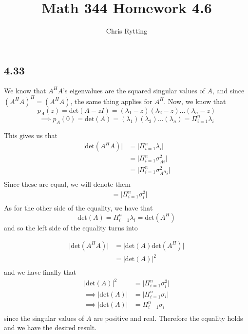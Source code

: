 \documentclass[letterpaper,12pt]{article}
\theoremstyle{definition}
\begin{document}
\title{Math 344 Homework 4.6}
\author{Chris Rytting}
\maketitle
\subsection*{4.33}
We know that $A^HA$'s eigenvalues are the squared singular values of $A$, and since $(A^HA)^H = (A^HA)$, the same thing applies for $A^H$. Now, we know that 
\[p_A(z) = \text{det}(A - zI) = (\lambda_1 - z) (\lambda_2 - z)\dots(\lambda_n - z) \]
\[\implies p_A(0) = \text{det}(A) = (\lambda_1) (\lambda_2)\dots(\lambda_n) =\Pi_{i = 1}^{n} \lambda_i  \]

This gives us that
\begin{align*}
    \vert \text{det}(A^HA)\vert &= \vert \Pi_{i = 1}^{n} \lambda_i \vert \\
    &= \vert \Pi_{i = 1}^{n} \sigma_{Ai}^2 \vert \\
    &= \vert \Pi_{i = 1}^{n} \sigma_{A^Hi}^2 \vert \\
\end{align*}
Since these are equal, we will denote them
\begin{align*}
    &= \vert \Pi_{i = 1}^{n} \sigma_{i}^2 \vert \\
\end{align*}
As for the other side of the equality, we have that
\[\text{det}(A) = \Pi_{i = 1}^{n} \lambda_i = \text{det}(A^H) \]
and so the left side of the equality turns into 
 
\begin{align*}
\vert \text{det}(A^HA)\vert &=\vert \text{det}(A)\text{det}(A^H)\vert  \\
&=\vert \text{det}(A)\vert^2 \\
\end{align*}
and we have finally that 
\begin{align*}
\vert \text{det}(A)\vert^2 &= \vert \Pi_{i = 1}^{n} \sigma_{i}^2 \vert \\
\implies \vert \text{det}(A)\vert &= \vert \Pi_{i = 1}^{n} \sigma_{i} \vert \\
\implies \vert \text{det}(A)\vert &=  \Pi_{i = 1}^{n} \sigma_{i} \\
\end{align*}
since the singular values of $A$ are positive and real. Therefore the equality holds and we have the desired result.
\end{document}
